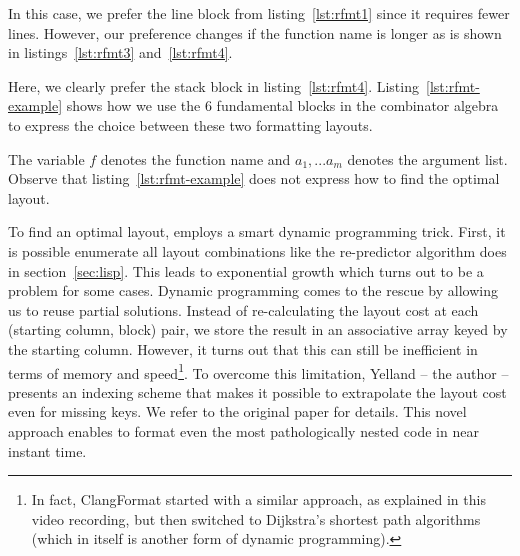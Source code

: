 In this case, we prefer the line block from listing~\ref{lst:rfmt1} since it requires fewer lines.
However, our preference changes if the function name is longer as is shown in listings~\ref{lst:rfmt3} and~\ref{lst:rfmt4}.

\begin{minipage}{.45\textwidth}
  
\end{minipage}
\hfil
\begin{minipage}{.45\textwidth}
  
\end{minipage}

Here, we clearly prefer the stack block in listing~\ref{lst:rfmt4}.
Listing~\ref{lst:rfmt-example} shows how we use the 6 fundamental blocks in the \rfmt{} combinator algebra to express the choice between these two formatting layouts.

The variable $f$ denotes the function name and $a_1, ... a_m$ denotes the argument list.
Observe that listing~\ref{lst:rfmt-example} does not express how to find the optimal layout.

To find an optimal layout, \rfmt{} employs a smart dynamic programming trick.
First, it is possible enumerate all layout combinations like the re-predictor algorithm does in section~\ref{sec:lisp}.
This leads to exponential growth which turns out to be a problem for some cases.
Dynamic programming comes to the rescue by allowing us to reuse partial solutions.
Instead of re-calculating the layout cost at each (starting column, block) pair, we store the result in an associative array keyed by the starting column.
However, it turns out that this can still be inefficient in terms of memory and speed\footnote{
  In fact, ClangFormat started with a similar approach, as explained in this\autocite{clang84:online} video recording, but then switched to Dijkstra's shortest path algorithms (which in itself is another form of dynamic programming).
}.
To overcome this limitation, Yelland -- the \rfmt{} author -- presents an indexing scheme that makes it possible to extrapolate the layout cost even for missing keys.
We refer to the original paper\autocite{yelland_new_2016} for details.
This novel approach enables \rfmt{} to format even the most pathologically nested code in near instant time.


